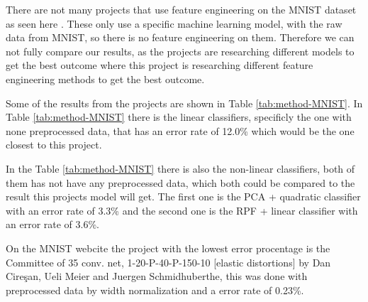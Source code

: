 There are not many projects that use feature engineering on the MNIST dataset as seen here \cite{Stochastic-optimization-neural-networks-assiri, BYERLY2021545, convolutional-neural-networks-convnets, multi-column-neural-network-ciregan, WaveMix-jeevan}. These only use a specific machine learning model, with the raw data from MNIST, so there is no feature engineering on them. Therefore we can not fully compare our results, as the projects are researching different models to get the best outcome where this project is researching different feature engineering methods to get the best outcome.

Some of the results from the projects are shown in Table \ref{tab:method-MNIST}.
In Table \ref{tab:method-MNIST} there is the linear classifiers, specificly the one with none preprocessed data, that has an error rate of 12.0\% which would be the one closest to this project.

In the Table \ref{tab:method-MNIST} there is also the non-linear classifiers, both of them has not have any preprocessed data, which both could be compared to the result this projects model will get. The first one is the PCA + quadratic classifier with an error rate of 3.3\% and the second one is the RPF + linear classifier with an error rate of 3.6\%.

On the MNIST webcite \cite{MNIST} the project with the lowest error procentage is the Committee of 35 conv. net, 1-20-P-40-P-150-10 [elastic distortions] by Dan Cireşan, Ueli Meier and Juergen Schmidhuberthe, this was done with preprocessed data by width normalization and a error rate of 0.23\%.
